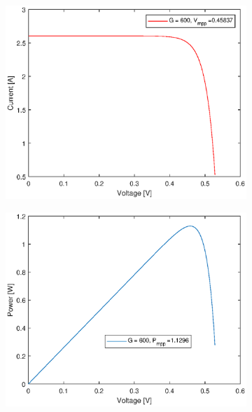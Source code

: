 \begin{figure}[H]
\begin{center}
\begin{subfigure}{0.4\textwidth}
\begin{center}
				\end{center}	
			\end{subfigure}
			\begin{subfigure}{0.4\textwidth}
				\begin{center}
					\includegraphics[width=1\textwidth]{figures/vg600.eps}
				\end{center}	
			\end{subfigure}
			\begin{subfigure}{0.4\textwidth}
				\begin{center}
					\includegraphics[width=1\textwidth]{figures/pg600.eps}

\end{center}
\end{subfigure}
\end{center}
\end{figure}
